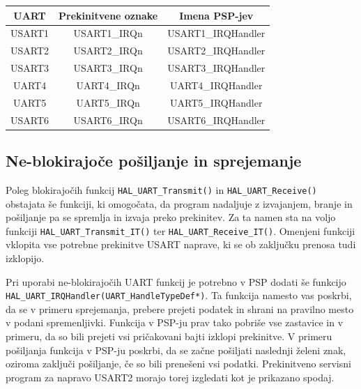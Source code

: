 \documentclass[12pt,letterpaper]{article}
\begin{document}
\begin{table}[ht!]
\centering
\begin{tabular}{c|c|c}
UART                         & Prekinitvene oznake               & Imena PSP-jev                           \\ \hline
\multicolumn{1}{c|}{USART1} & \multicolumn{1}{c|}{USART1\_IRQn} & \multicolumn{1}{c}{USART1\_IRQHandler} \\ \hline
\multicolumn{1}{c|}{USART2} & \multicolumn{1}{c|}{USART2\_IRQn} & \multicolumn{1}{c}{USART2\_IRQHandler} \\ \hline
\multicolumn{1}{c|}{USART3} & \multicolumn{1}{c|}{USART3\_IRQn} & \multicolumn{1}{c}{USART3\_IRQHandler} \\ \hline
\multicolumn{1}{c|}{UART4}  & \multicolumn{1}{c|}{UART4\_IRQn}  & \multicolumn{1}{c}{UART4\_IRQHandler}  \\ \hline
\multicolumn{1}{c|}{UART5}  & \multicolumn{1}{c|}{UART5\_IRQn}  & \multicolumn{1}{c}{UART5\_IRQHandler}  \\ \hline
\multicolumn{1}{c|}{USART6} & \multicolumn{1}{c|}{USART6\_IRQn} & \multicolumn{1}{c}{USART6\_IRQHandler}
\end{tabular}
\end{table}


\subsection*{Ne-blokirajoče pošiljanje in sprejemanje}

Poleg blokirajočih funkcij \texttt{HAL\_UART\_Transmit()} in \texttt{HAL\_UART\_Receive()} obstajata še funkciji, ki omogočata, da program nadaljuje z izvajanjem, branje in pošiljanje pa se spremlja in izvaja preko prekinitev. Za ta namen sta na voljo funkciji \texttt{HAL\_UART\_Transmit\_IT()} ter \texttt{HAL\_UART\_Receive\_IT()}. Omenjeni funkciji vklopita vse potrebne prekinitve USART naprave, ki se ob zaključku prenosa tudi izklopijo. 

Pri uporabi ne-blokirajočih UART funkcij je potrebno v PSP dodati še funkcijo  \texttt{HAL\_UART\_IRQHandler(UART\_HandleTypeDef*)}. Ta funkcija namesto vas poskrbi, da se v primeru sprejemanja, prebere prejeti podatek in shrani na pravilno mesto v podani spremenljivki. Funkcija v PSP-ju prav tako pobriše vse zastavice in v primeru, da so bili prejeti vsi pričakovani bajti izklopi prekinitve. V primeru pošiljanja funkcija v PSP-ju poskrbi, da se začne pošiljati naslednji želeni znak, oziroma zaključi pošiljanje, če so bili prenešeni vsi podatki. Prekinitveno servisni program za napravo USART2 morajo torej izgledati kot je prikazano spodaj.
\end{document}
